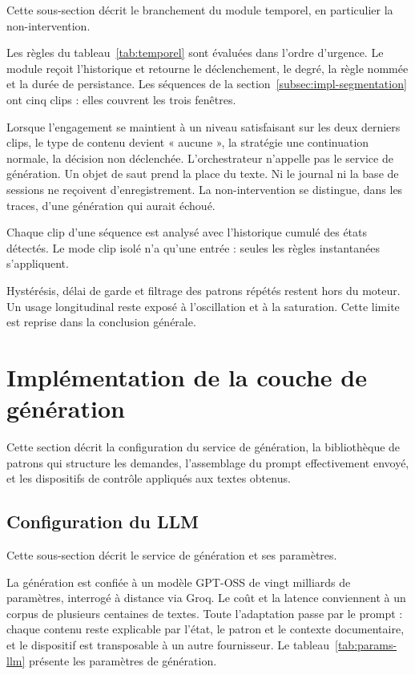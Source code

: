 Cette sous-section décrit le branchement du module temporel,
en particulier la non-intervention.

Les règles du tableau~\ref{tab:temporel} sont évaluées dans l'ordre
d'urgence. Le module reçoit l'historique et retourne le
déclenchement, le degré, la règle nommée et la durée de persistance.
Les séquences de la section~\ref{subsec:impl-segmentation} ont cinq
clips : elles couvrent les trois fenêtres.

Lorsque l'engagement se maintient à un niveau satisfaisant sur les
deux derniers clips, le type de contenu devient « aucune », la
stratégie une continuation normale, la décision non déclenchée.
L'orchestrateur n'appelle pas le service de génération. Un objet de
saut prend la place du texte. Ni le journal ni la base de sessions
ne reçoivent d'enregistrement. La non-intervention se distingue,
dans les traces, d'une génération qui aurait échoué.

Chaque clip d'une séquence est analysé avec l'historique cumulé des
états détectés. Le mode clip isolé n'a qu'une entrée : seules les
règles instantanées s'appliquent.

Hystérésis, délai de garde et filtrage des patrons répétés restent
hors du moteur. Un usage longitudinal reste exposé à l'oscillation
et à la saturation. Cette limite est reprise dans la conclusion
générale.

\section{Implémentation de la couche de génération}
\label{sec:impl-generation}

Cette section décrit la
configuration du service de génération, la bibliothèque de patrons qui structure
les demandes, l'assemblage du prompt effectivement envoyé, et les dispositifs de
contrôle appliqués aux textes obtenus.

\subsection{Configuration du LLM}
\label{subsec:impl-llm}

Cette sous-section décrit le service de génération et ses paramètres.

La génération est confiée à un modèle \textsc{GPT-OSS} de vingt
milliards de paramètres, interrogé à distance via Groq. Le coût et
la latence conviennent à un corpus de plusieurs centaines de textes.
Toute l'adaptation passe par le prompt : chaque contenu reste
explicable par l'état, le patron et le contexte documentaire, et le
dispositif est transposable à un autre fournisseur.
Le tableau~\ref{tab:params-llm} présente les paramètres de génération.


